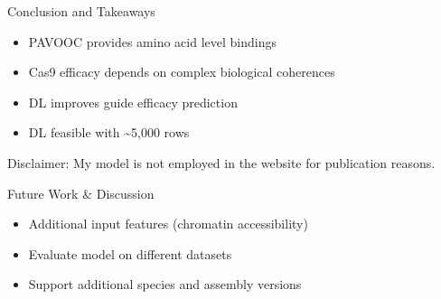 \documentclass[Nike]{tuberlinbeamer}
\begin{document}

\begin{frame}{Conclusion and Takeaways}
  \begin{itemize}
    \item PAVOOC provides amino acid level bindings
    \item Cas9 efficacy depends on complex biological coherences %
    \item DL improves guide efficacy prediction %
    \item DL feasible with \textasciitilde5,000 rows
  \end{itemize}
  Disclaimer: My model is not employed in the website for publication reasons.

\end{frame}


\begin{frame}{Future Work \& Discussion}
  \begin{itemize}
    \item Additional input features (chromatin accessibility)
    \item Evaluate model on different datasets
    \item Support additional species and assembly versions
  \end{itemize}
\end{frame}

\end{document}
